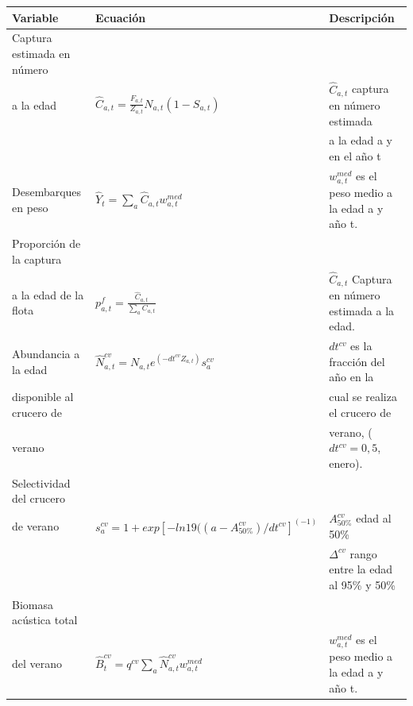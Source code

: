 \documentclass[
  spanish,
]{article}
\begin{document}
\begin{table}[h]
    \centering
    \resizebox{17cm}{!} {
    \begin{tabular}{|l|l|l|}
    \hline
Variable                   &    Ecuación                                                           &    Descripción \\ \hline
Captura estimada en número &                                                                     & \\
a la edad                    & $\hat C_{a,t}=\frac{F_{a,t}}{Z_{a,t}}N_{a,t} (1-S_{a,t})$           & $\hat C_{a,t}$ captura en número estimada \\
                           &                                                                     & a la edad a y en el año t \\ \hline
Desembarques en peso       & $\hat Y_t= \sum_a \hat C_{a,t} w_{a,t}^{med}$                       & $w_{a,t}^{med}$ es el peso medio a la edad a y año t. \\ \hline
Proporción de la captura   &                                                                     & \\
a la edad de la flota      & $p_{a,t}^f=\frac{\hat C_{a,t}}{\sum_a C_{a,t}}$                     & $\hat C_{a,t}$ Captura en número estimada a la edad.\\ \hline
Abundancia a la edad       & $\hat N_{a,t}^{cv}=N_{a,t} e^{(-dt^{cv} Z_{a,t})} s_a^{cv}$         & $dt^{cv}$ es la fracción del año en la \\
disponible al crucero de   &                                                                     & cual se realiza el crucero de \\
verano                     &                                                                     & verano, ($dt^{cv}=0,5$, enero). \\ \hline
Selectividad del crucero   &                                                                     &\\
de verano                  & $s_a^{cv}=1+exp[-ln19((a-A_{50\%}^{cv})/dt^{cv}]^{(-1)}$            & $A_{50\%}^{cv}$ edad al 50\% \\
                           &                                                                     & $\Delta^{cv}$ rango entre la edad al 95\% y 50\% \\ \hline
Biomasa acústica total     &                                                                     &\\
del verano                 & $\hat B_t^{cv}=q^{cv} \sum_a \hat N_{a,t}^{cv} w_{a,t}^{med}$       & $w_{a,t}^{med}$ es el peso medio a la edad a y año t.\\

\end{tabular}}
\end{table}
\end{document}
